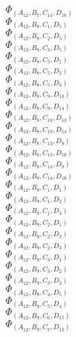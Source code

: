 \documentclass[14pt]{article}
\begin{document}
    $\Phi_{({A}_{12}, {B}_{7}, {C}_{14}, {D}_{10})}$ \\ 
    $\Phi_{({A}_{12}, {B}_{8}, {C}_{1}, {D}_{5})}$ \\ 
    $\Phi_{({A}_{12}, {B}_{8}, {C}_{2}, {D}_{5})}$ \\ 
    $\Phi_{({A}_{12}, {B}_{8}, {C}_{3}, {D}_{5})}$ \\ 
    $\Phi_{({A}_{12}, {B}_{8}, {C}_{5}, {D}_{1})}$ \\ 
    $\Phi_{({A}_{12}, {B}_{8}, {C}_{5}, {D}_{2})}$ \\ 
    $\Phi_{({A}_{12}, {B}_{8}, {C}_{5}, {D}_{3})}$ \\ 
    $\Phi_{({A}_{12}, {B}_{8}, {C}_{9}, {D}_{13})}$ \\ 
    $\Phi_{({A}_{12}, {B}_{8}, {C}_{9}, {D}_{14})}$ \\ 
    $\Phi_{({A}_{12}, {B}_{8}, {C}_{10}, {D}_{13})}$ \\ 
    $\Phi_{({A}_{12}, {B}_{8}, {C}_{10}, {D}_{14})}$ \\ 
    $\Phi_{({A}_{12}, {B}_{8}, {C}_{13}, {D}_{9})}$ \\ 
    $\Phi_{({A}_{12}, {B}_{8}, {C}_{13}, {D}_{10})}$ \\ 
    $\Phi_{({A}_{12}, {B}_{8}, {C}_{14}, {D}_{9})}$ \\ 
    $\Phi_{({A}_{12}, {B}_{8}, {C}_{14}, {D}_{10})}$ \\ 
    $\Phi_{({A}_{12}, {B}_{9}, {C}_{1}, {D}_{1})}$ \\ 
    $\Phi_{({A}_{12}, {B}_{9}, {C}_{1}, {D}_{2})}$ \\ 
    $\Phi_{({A}_{12}, {B}_{9}, {C}_{1}, {D}_{3})}$ \\ 
    $\Phi_{({A}_{12}, {B}_{9}, {C}_{2}, {D}_{1})}$ \\ 
    $\Phi_{({A}_{12}, {B}_{9}, {C}_{2}, {D}_{2})}$ \\ 
    $\Phi_{({A}_{12}, {B}_{9}, {C}_{2}, {D}_{3})}$ \\ 
    $\Phi_{({A}_{12}, {B}_{9}, {C}_{3}, {D}_{1})}$ \\ 
    $\Phi_{({A}_{12}, {B}_{9}, {C}_{3}, {D}_{2})}$ \\ 
    $\Phi_{({A}_{12}, {B}_{9}, {C}_{3}, {D}_{3})}$ \\ 
    $\Phi_{({A}_{12}, {B}_{9}, {C}_{4}, {D}_{5})}$ \\ 
    $\Phi_{({A}_{12}, {B}_{9}, {C}_{5}, {D}_{4})}$ \\ 
    $\Phi_{({A}_{12}, {B}_{9}, {C}_{6}, {D}_{15})}$ \\ 
    $\Phi_{({A}_{12}, {B}_{9}, {C}_{7}, {D}_{13})}$ \\ 
\end{document}
